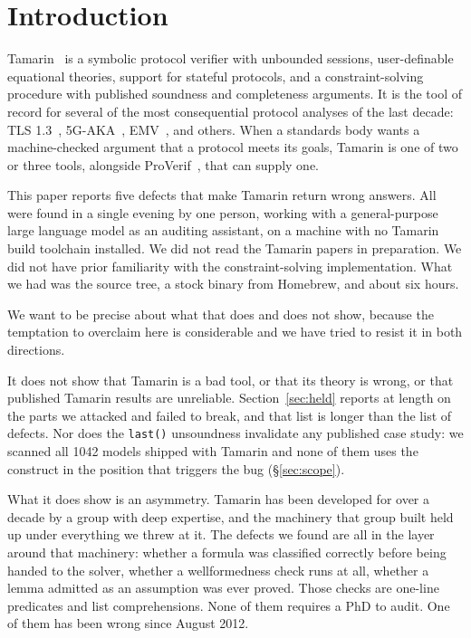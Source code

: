\documentclass[version=preprint]{iacrcc}
\newcommand{\code}[1]{\texttt{\small #1}}
\theoremstyle{definition}
\theoremstyle{remark}
\begin{document}
\section{Introduction}\label{sec:intro}

Tamarin~\cite{TamarinCAV,TamarinCSF} is a symbolic protocol verifier with
unbounded sessions, user-definable equational theories, support for stateful
protocols, and a constraint-solving procedure with published soundness and
completeness arguments. It is the tool of record for several of the most
consequential protocol analyses of the last decade: TLS 1.3~\cite{TLS13},
5G-AKA~\cite{FiveG}, EMV~\cite{EMV}, and others. When a standards body wants a
machine-checked argument that a protocol meets its goals, Tamarin is one of two
or three tools, alongside ProVerif~\cite{ProVerif}, that can supply one.

This paper reports five defects that make Tamarin return wrong answers. All
were found in a single evening by one person, working with a
general-purpose large language model as an auditing assistant, on a machine
with no Tamarin build toolchain installed. We did not read the Tamarin papers
in preparation. We did not have prior familiarity with the constraint-solving
implementation. What we had was the source tree, a stock binary from Homebrew,
and about six hours.

We want to be precise about what that does and does not show, because the
temptation to overclaim here is considerable and we have tried to resist it in
both directions.

It does not show that Tamarin is a bad tool, or that its theory is wrong, or
that published Tamarin results are unreliable. Section~\ref{sec:held} reports
at length on the parts we attacked and failed to break, and that list is longer
than the list of defects. Nor does the \code{last()} unsoundness invalidate any
published case study: we scanned all 1042 models shipped with Tamarin and none
of them uses the construct in the position that triggers the bug
(\S\ref{sec:scope}).

What it does show is an asymmetry. Tamarin has been developed for over a
decade by a group with deep expertise, and the machinery that group built held
up under everything we threw at it. The defects we found are all in the layer
around that machinery: whether a formula was classified correctly before being
handed to the solver, whether a wellformedness check runs at all, whether a
lemma admitted as an assumption was ever proved. Those checks are one-line
predicates and list comprehensions. None of them requires a PhD to audit. One
of them has been wrong since August 2012.
\end{document}
